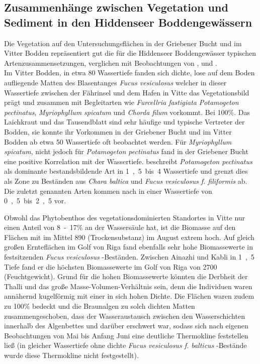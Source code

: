 \subsection{Zusammenhänge zwischen Vegetation und Sediment in den Hiddenseer Boddengewässern}

Die Vegetation auf den Untersuchungsflächen in der Griebener Bucht und im Vitter Bodden repräsentiert gut die für die Hiddenseer Boddengewässer typischen Artenzusammensetzungen, verglichen mit Beobachtungen von \cite{flugge_2004}, \cite{kunzenbach_1955} und \cite{muller-stoll_1961}.
\\
Im Vitter Bodden, in etwa \unit{80}{\centi\metre} Wassertiefe fanden sich dichte, lose auf dem Boden aufliegende Matten des Blasentanges \textit{Fucus vesiculosus} welcher in dieser Wassertiefe zwischen der Fährinsel und dem Hafen in Vitte das Vegetationsbild prägt und zusammen mit Begleitarten wie \textit{Furcellria fastigiata} \textit{Potamogeton pectinatus}, \textit{Myriophyllum spicatum} und \textit{Chorda filum} vorkommt. Bei \unit{100}{\%}. Das Laichkraut und das Tausendblatt sind sehr häufige und typische Vertreter der Bodden, sie konnte ihr Vorkommen in der Griebener Bucht und im Vitter Bodden ab etwa \unit{50}{\centi\metre} Wassertiefe oft beobachtet werden. Für \textit{Myriophyllum spicatum}, nicht jedoch für \textit{Potamogeton pectinatus} fand \cite{flugge_2004} in der Griebener Bucht eine positive Korrelation mit der Wassertiefe. 
\cite{muller-stoll_1961}  beschreibt \textit{Potamogeton pectinatus} als dominante bestandsbildende Art in \unit{1,5 bis 4}{\metre} Wassertiefe und grenzt dies als Zone zu Beständen aus \textit{Chara baltica} und \textit{Fucus vesiculosus f. filiformis} ab. Die zuletzt genannten Arten kommen nach  \cite{muller-stoll_1961} in einer Wassertiefe von \unit{0,5 bis 2,5}{\metre} vor. 

Obwohl das Phytobenthos des vegetationsdominierten Standortes in Vitte nur einen Anteil von \unit{8-17}{\%} an der Wassersäule hat, ist die Biomasse auf den Flächen mit im Mittel \unit{890}{\gram\per\metre\suqared} (Trockensubstanz) im August extrem hoch. Auf gleich großen Ernteflächen im Golf von Riga fand \cite{martin_1999} ebenfalls sehr hohe Biomassewerte in festsitzenden \textit{Fucus vesiculosus} -Beständen. Zwischen Ainazhi und Kabli in \unit{1,5}{\metre} Tiefe fand er die höchsten Biomassewerte im Golf von Riga von \unit{2700}{\gram\per\metre\suqared} (Feuchtgewicht). Grund für die hohen Biomassewerte könnten die Derbheit der Thalli und das große Masse-Volumen-Verhältnis sein, denn die Individuen waren annähernd kugelförmig mit einer in sich hohen Dichte. Die Flächen waren zudem zu \unit{100}{\%} bedeckt und die Braunalgen zu solch dichten Matten zusammengeschoben, dass  der Wasseraustausch zwischen den Wasserschichten innerhalb des Algenbettes und darüber erschwert war, sodass sich nach eigenen Beobachtungen von Mai bis Anfang Juni eine deutliche Thermokline feststellen ließ (in gleicher Wassertiefe ohne dichte \textit{Fucus vesiculosus f. balticus} -Bestände wurde diese Thermokline nicht festgestellt). 

